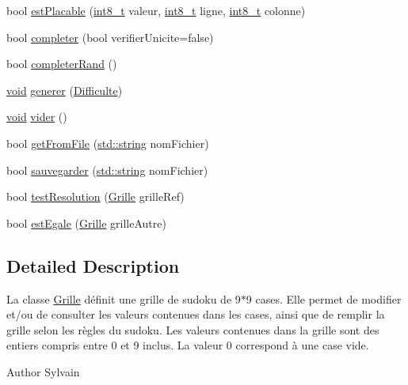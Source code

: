 \begin{DoxyCompactItemize}
\item 
bool \hyperlink{class_grille_a80df60bde37f2db8363f33d38e1d6ab9}{est\+Placable} (\hyperlink{_s_d_l__config__dreamcast_8h_aef44329758059c91c76d334e8fc09700}{int8\+\_\+t} valeur, \hyperlink{_s_d_l__config__dreamcast_8h_aef44329758059c91c76d334e8fc09700}{int8\+\_\+t} ligne, \hyperlink{_s_d_l__config__dreamcast_8h_aef44329758059c91c76d334e8fc09700}{int8\+\_\+t} colonne)
\item 
bool \hyperlink{class_grille_a3c994f0e6ab5b8fa39e4fb95e8a8c7ca}{completer} (bool verifier\+Unicite=false)
\item 
bool \hyperlink{class_grille_aa97e126d9b016fd50045f4bd003ba8b8}{completer\+Rand} ()
\item 
\hyperlink{_s_d_l__opengl_8h_a3db05964a3cc4410f35b7ea2b7eb850d}{void} \hyperlink{class_grille_ae1cfb09dc887aa908ec8bfcb7b1efffe}{generer} (\hyperlink{_enum_difficulte_8h_ad3df9804641f6ea0105cd2a89f495555}{Difficulte})
\item 
\hyperlink{_s_d_l__opengl_8h_a3db05964a3cc4410f35b7ea2b7eb850d}{void} \hyperlink{class_grille_a54a7537f4d21d81769fb11028af22a8a}{vider} ()
\item 
bool \hyperlink{class_grille_a477bfab95c75b20dd1512fe3df24db8c}{get\+From\+File} (\hyperlink{_s_d_l__opengl_8h_ae9ea2d206f76ea82db7a2ea002fdef2f}{std\+::string} nom\+Fichier)
\item 
bool \hyperlink{class_grille_a6fedc971d7c1051301ddd636c28720a6}{sauvegarder} (\hyperlink{_s_d_l__opengl_8h_ae9ea2d206f76ea82db7a2ea002fdef2f}{std\+::string} nom\+Fichier)
\item 
bool \hyperlink{class_grille_a070c5a3cac66d19a51d78fcce240804c}{test\+Resolution} (\hyperlink{class_grille}{Grille} grille\+Ref)
\item 
bool \hyperlink{class_grille_a5782780f841ceed00cf9679d98dff58a}{est\+Egale} (\hyperlink{class_grille}{Grille} grille\+Autre)
\end{DoxyCompactItemize}


\subsection{Detailed Description}
La classe \hyperlink{class_grille}{Grille} définit une grille de sudoku de 9$\ast$9 cases. Elle permet de modifier et/ou de consulter les valeurs contenues dans les cases, ainsi que de remplir la grille selon les règles du sudoku. Les valeurs contenues dans la grille sont des entiers compris entre 0 et 9 inclus. La valeur 0 correspond à une case vide. \begin{DoxyAuthor}{Author}
Sylvain 
\end{DoxyAuthor}



